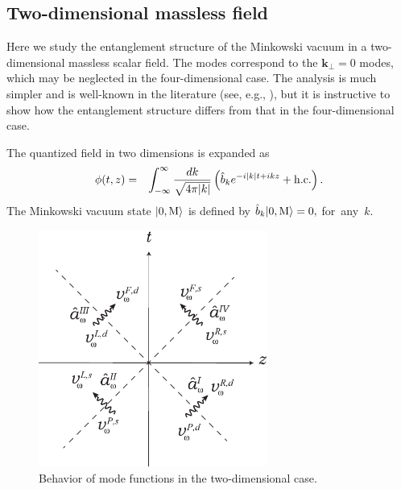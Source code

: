 \documentclass[aps,prd,preprintnumbers,nofootinbib,showpacs]{revtex4}%
\begin{document}
\begin{widetext}
\section{Two-dimensional massless field \label{Sec:entangeD=2} }
Here we study the entanglement structure of the Minkowski vacuum in
a two-dimensional massless scalar field. 
The modes correspond to the $\bm k_\perp=0$ modes, which may be neglected in the four-dimensional case. 
The analysis is much simpler 
and is well-known in the literature (see, e.g., \cite{Higuchi}), but it is instructive to show
how the entanglement structure differs from that in the four-dimensional case. 


The quantized field in two dimensions is expanded as 
\begin{eqnarray}
\phi(t,z)&=&\int_{-\infty}^{\infty} {dk\over \sqrt{4\pi|k|}}
\left( {\hat b}_{k}e^{-i|k|t+ikz}+{\rm h.c.}  
\right).
\label{phitz2}
\end{eqnarray}
The Minkowski vacuum state $|0,{\rm M}\rangle$ is defined by 
$\hat b_{k}|0,{\rm M}\rangle=0, $
for~any~$k$.

\begin{figure}[t]
\begin{center}
    \includegraphics[width=7.5cm]{fig4.eps}
\caption{Behavior of mode functions in the two-dimensional case.
\label{fig:coordinate2}}
\end{center}
\end{figure}


\end{widetext}
\end{document}
